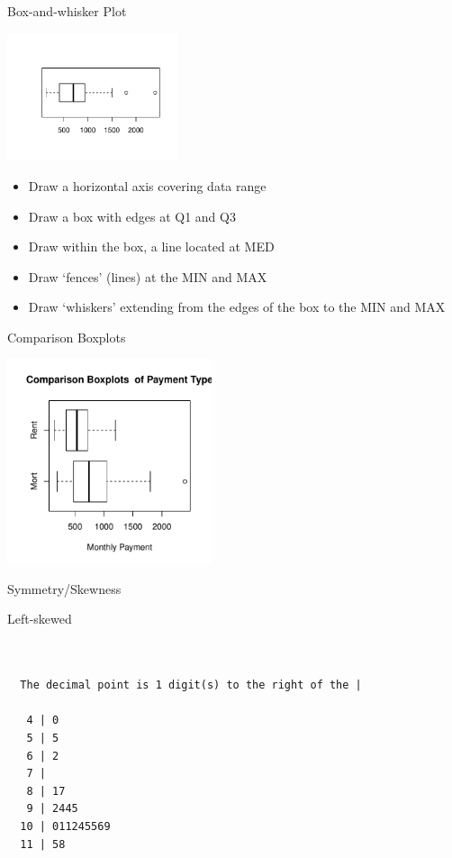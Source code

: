 \documentclass[14pt]{beamer}\usepackage[]{graphicx}\usepackage[]{color}
\begin{document}
\begin{frame}[fragile]{Box-and-whisker Plot}


\includegraphics[width=5cm]{figure/LBL2Ac-1} 


\vspace{-8mm}

\begin{itemize}
\item<1-> Draw a horizontal axis covering data range
\item<2-> Draw a box with edges at Q1 and Q3
\item<3-> Draw within the box, a line located at MED
\item<4-> Draw `fences' (lines) at the MIN and MAX
\item<5-> Draw `whiskers' extending from the edges of the box to the MIN and MAX
\end{itemize}
\end{frame}

\begin{frame}[fragile]{Comparison Boxplots}


\includegraphics[width=6cm]{figure/LBL2Ad-1} 

\end{frame}

\begin{frame}[fragile]{Symmetry/Skewness}

Left-skewed
{\footnotesize{
\begin{verbatim}


  The decimal point is 1 digit(s) to the right of the |

   4 | 0
   5 | 5
   6 | 2
   7 | 
   8 | 17
   9 | 2445
  10 | 011245569
  11 | 58


\end{verbatim}
}}
\end{frame}
\end{document}
